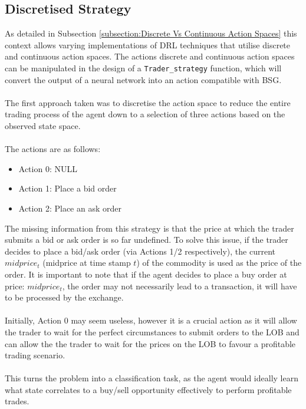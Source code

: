 \documentclass[ %
                    author={Ashwinder Khurana},
                supervisor={Prof Dave Cliff},
                    degree={MEng},
                     title={The Deeply Reinforced Trader},
                  subtitle={},
                      type={enterprise},
                      year={2020} ]{dissertation}
\begin{document}
{\subsection{Discretised Strategy}
\label{subsection:Discretised Strategy}
As detailed in Subsection \ref{subsection:Discrete Vs Continuous Action Spaces} this context allows varying implementations of DRL techniques that utilise discrete and continuous action spaces. The actions discrete and continuous action spaces can be manipulated in the design of a \texttt{Trader\_strategy} function, which will convert the output of a neural network into an action compatible with BSG. 
\\
\\
The first approach taken was to discretise the action space to reduce the entire trading process of the agent down to a selection of three actions based on the observed state space.
\\
\\
The actions are as follows: 
\begin{itemize}
\item Action 0: NULL 
\item Action 1: Place a bid order
\item Action 2: Place an ask order
\end{itemize}

\noindent
The missing information from this strategy is that the price at which the trader submits a bid or ask order is so far undefined. To solve this issue, if the trader decides to place a bid/ask order (via Actions 1/2 respectively), the current $midprice_t$ (midprice at time stamp $t$) of the commodity is used as the price of the order. It is important to note that if the agent decides to place a buy order at price: $midprice_t$, the order may not necessarily lead to a transaction, it will have to be processed by the exchange. 
\\
\\
Initially, Action 0 may seem useless, however it is a crucial action as it will allow the trader to wait for the perfect circumstances to submit orders to the LOB and can allow the the trader to wait for the prices on the LOB to favour a profitable trading scenario.
\\
\\
This turns the problem into a classification task, as the agent would ideally learn what state correlates to a buy/sell opportunity effectively to perform profitable trades. 

}
\end{document}
